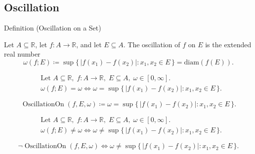 
\subsection*{Oscillation}
\label{sec:oscillation}

\begin{definitionbox}{Definition (Oscillation on a Set)}
\begin{definition}
\label{def:oscillation-on-a-set}
Let $A\subseteq\mathbb{R}$, let $f:A\to\mathbb{R}$, and let
$E\subseteq A$. The oscillation of $f$ on $E$ is the extended real number
\[
\omega(f;E)\coloneqq
\sup\{\,|f(x_1)-f(x_2)|:x_1,x_2\in E\,\}
=\mathrm{diam}(f(E)).
\]
\end{definition}
\end{definitionbox}

\begin{remark*}
\[
\begin{aligned}
&\text{Let } A\subseteq\mathbb{R},\; f:A\to\mathbb{R},\; E\subseteq A,\;
\omega\in[0,\infty].\\
&\omega(f;E)=\omega
\Longleftrightarrow
\omega=\sup\{\,|f(x_1)-f(x_2)|:x_1,x_2\in E\,\}.
\end{aligned}
\]
\end{remark*}

\begin{remark*}
\[
\operatorname{OscillationOn}(f,E,\omega)
\coloneqq
\omega=\sup\{\,|f(x_1)-f(x_2)|:x_1,x_2\in E\,\}.
\]
\end{remark*}

\begin{remark*}
\[
\begin{aligned}
&\text{Let } A\subseteq\mathbb{R},\; f:A\to\mathbb{R},\; E\subseteq A,\;
\omega\in[0,\infty].\\
&\omega(f;E)\ne\omega
\Longleftrightarrow
\omega\ne\sup\{\,|f(x_1)-f(x_2)|:x_1,x_2\in E\,\}.
\end{aligned}
\]
\end{remark*}

\begin{remark*}
\[
\neg\operatorname{OscillationOn}(f,E,\omega)
\Longleftrightarrow
\omega\ne\sup\{\,|f(x_1)-f(x_2)|:x_1,x_2\in E\,\}.
\]
\end{remark*}

